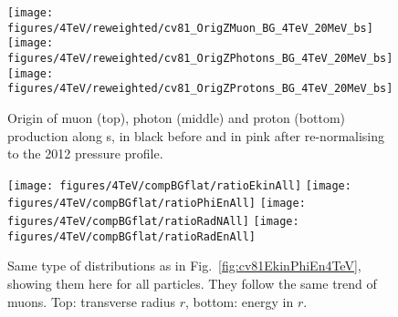 \newpage



   


\begin{figure}
  
\begin{center}
  \texttt{[image: figures/4TeV/reweighted/cv81\_OrigZMuon\_BG\_4TeV\_20MeV\_bs]}
  \texttt{[image: figures/4TeV/reweighted/cv81\_OrigZPhotons\_BG\_4TeV\_20MeV\_bs]}
  \texttt{[image: figures/4TeV/reweighted/cv81\_OrigZProtons\_BG\_4TeV\_20MeV\_bs]}
\end{center}
\vspace{-0.6cm}
 \caption{Origin of muon (top), photon (middle) and proton (bottom) production along s, in black before and in pink after re-normalising to the 2012 pressure profile. 
  \label{fig:OrigZ4TeV2}}
\end{figure}

\begin{figure}
\begin{center}
   \texttt{[image: figures/4TeV/compBGflat/ratioEkinAll]}
   \texttt{[image: figures/4TeV/compBGflat/ratioPhiEnAll]}
  \texttt{[image: figures/4TeV/compBGflat/ratioRadNAll]}
  \texttt{[image: figures/4TeV/compBGflat/ratioRadEnAll]}
\end{center}
\vspace{-0.6cm}
 \caption{Same type of distributions as in Fig.~\ref{fig:cv81EkinPhiEn4TeV}, showing them here for all particles. They follow the same trend of muons. Top: transverse radius $r$, bottom: energy in $r$. 
  \label{fig:cv81EkinPhiEn4TeV2}} 
\end{figure}


